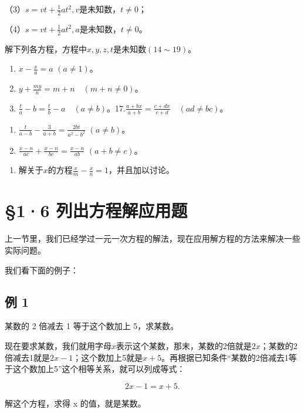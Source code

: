 （3）\(s = vt + \frac{1}{2} at^2, v\)是未知数，\(t \neq 0\)；

（4）\(s = vt + \frac{1}{2} at^2, a\)是未知数，\(t \neq 0\)。

解下列各方程，方程中\(x, y, z, t\)是未知数\((14 \sim 19)\)。

\begin{enumerate}[start=14]
\item
  \(x - \frac{x}{a} = a\) \((a \neq 1)\)。
\item
  \(y + \frac{my}{n} = m + n \quad (m + n \neq 0)\)。
\item
  \(\frac{t}{a} - b = \frac{t}{b} - a \quad (a \neq b)\)。17.\(\frac{a + bx}{a + b} = \frac{c + dx}{c + d} \quad (ad \neq bc)\)。
\end{enumerate}

\begin{enumerate}[start=18]
\item
  \(\frac{t}{a - b} - \frac{3}{a + b} = \frac{2bt}{a^2 - b^2}\) \((a \neq b)\)。
\item
  \(\frac{x - n}{ac} + \frac{x - n}{bc} = \frac{x - n}{ab}\) \((a + b \neq c)\)。
\end{enumerate}

\begin{enumerate}[start=20]
\item
  解关于\(x\)的方程\(\frac{x}{m} - \frac{x}{n} = 1\)，并且加以讨论。
\end{enumerate}

\section{§1·6 列出方程解应用题}

上一节里，我们已经学过一元一次方程的解法，现在应用解方程的方法来解决一些实际问题。

我们看下面的例子：

\subsection{例 1}

某数的 2 倍减去 1 等于这个数加上 5，求某数。

现在要求某数，我们就用字母\(x\)表示这个某数，那末，某数的2倍就是\(2x\)；某数的2倍减去1就是\(2x - 1\)；这个数加上5就是\(x + 5\)。再根据已知条件``某数的2倍减去1等于这个数加上5''这个相等关系，就可以列成等式：

\[
2 x - 1 = x + 5.
\]

解这个方程，求得 x 的值，就是某数。

